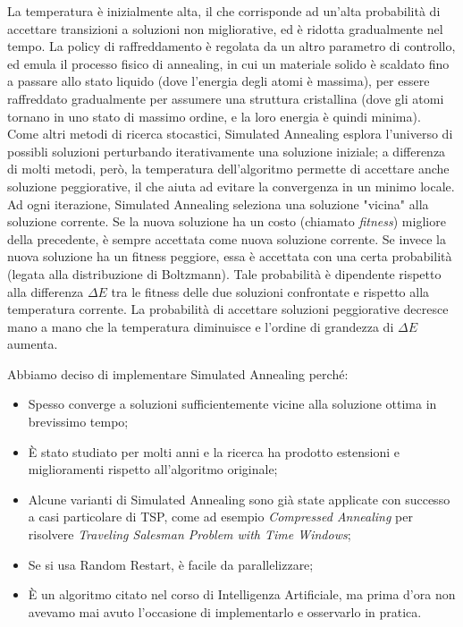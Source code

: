 \noindent La temperatura è inizialmente alta, il che corrisponde ad un'alta probabilità di accettare transizioni a soluzioni non migliorative, ed è ridotta gradualmente nel tempo. La policy di raffreddamento è regolata da un altro parametro di controllo, ed emula il processo fisico di annealing, in cui un materiale solido è scaldato fino a passare allo stato liquido (dove l'energia degli atomi è massima), per essere raffreddato gradualmente per assumere una struttura cristallina (dove gli atomi tornano in uno stato di massimo ordine, e la loro energia è quindi minima). \\

\noindent Come altri metodi di ricerca stocastici, Simulated Annealing esplora l'universo di possibli soluzioni perturbando iterativamente una soluzione iniziale; a differenza di molti metodi, però, la temperatura dell'algoritmo permette di accettare anche soluzione peggiorative, il che aiuta ad evitare la convergenza in un minimo locale. \\

\noindent Ad ogni iterazione, Simulated Annealing seleziona una soluzione "vicina" alla soluzione corrente. Se la nuova soluzione ha un costo (chiamato \textit{fitness}) migliore della precedente, è sempre accettata come nuova soluzione corrente. Se invece la nuova soluzione ha un fitness peggiore, essa è accettata con una certa probabilità (legata alla distribuzione di Boltzmann). Tale probabilità è dipendente rispetto alla differenza $\Delta E$ tra le fitness delle due soluzioni confrontate e rispetto alla temperatura corrente. La probabilità di accettare soluzioni peggiorative decresce mano a mano che la temperatura diminuisce e l'ordine di grandezza di $\Delta E$ aumenta.

\noindent Abbiamo deciso di implementare Simulated Annealing perché:

\begin{itemize}
    \item Spesso converge a soluzioni sufficientemente vicine alla soluzione ottima in brevissimo tempo;
    \item È stato studiato per molti anni e la ricerca ha prodotto estensioni e miglioramenti rispetto all'algoritmo originale;
    \item Alcune varianti di Simulated Annealing sono già state applicate con successo a casi particolare di TSP, come ad esempio \textit{Compressed Annealing} per risolvere \textit{Traveling Salesman Problem with Time Windows};
    \item Se si usa Random Restart, è facile da parallelizzare;
    \item È un algoritmo citato nel corso di Intelligenza Artificiale, ma prima d'ora non avevamo mai avuto l'occasione di implementarlo e osservarlo in pratica.
\end{itemize}


